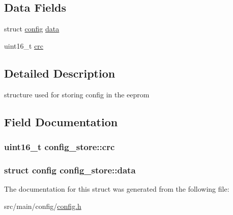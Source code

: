 \subsection*{Data Fields}
\begin{DoxyCompactItemize}
\item 
struct \hyperlink{structconfig}{config} \hyperlink{structconfig__store_ac4698f27d56ed88e037bd2994aed59c5}{data}
\item 
uint16\+\_\+t \hyperlink{structconfig__store_a8cbcf52579b9df1b4cecbbaa7e005798}{crc}
\end{DoxyCompactItemize}


\subsection{Detailed Description}
structure used for storing config in the eeprom 

\subsection{Field Documentation}
\hypertarget{structconfig__store_a8cbcf52579b9df1b4cecbbaa7e005798}{
\subsubsection[{crc}]{\setlength{\rightskip}{0pt plus 5cm}uint16\+\_\+t config\+\_\+store\+::crc}}\label{structconfig__store_a8cbcf52579b9df1b4cecbbaa7e005798}
\hypertarget{structconfig__store_ac4698f27d56ed88e037bd2994aed59c5}{
\subsubsection[{data}]{\setlength{\rightskip}{0pt plus 5cm}struct {\bf config} config\+\_\+store\+::data}}\label{structconfig__store_ac4698f27d56ed88e037bd2994aed59c5}


The documentation for this struct was generated from the following file\+:\begin{DoxyCompactItemize}
\item 
src/main/config/\hyperlink{config_8h}{config.\+h}\end{DoxyCompactItemize}
